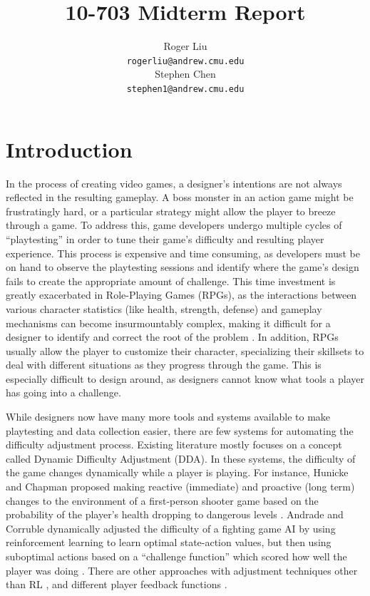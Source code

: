 \documentclass{article}
\title{10-703 Midterm Report}
\author{
  Roger Liu \\
  \texttt{rogerliu@andrew.cmu.edu} \\
  \And
  Stephen Chen \\
  \texttt{stephen1@andrew.cmu.edu} \\
}
\begin{document}
\maketitle
\section{Introduction}
In the process of creating video games, a designer’s intentions are not always reflected in the resulting gameplay. A boss monster in an action game might be frustratingly hard, or a particular strategy might allow the player to breeze through a game. To address this, game developers undergo multiple cycles of ``playtesting'' in order to tune their game's difficulty and resulting player experience. This process is expensive and time consuming, as developers must be on hand to observe the playtesting sessions and identify where the game's design fails to create the appropriate amount of challenge. This time investment is greatly exacerbated in Role-Playing Games (RPGs), as the interactions between various character statistics (like health, strength, defense) and gameplay mechanisms can become insurmountably complex, making it difficult for a designer to identify and correct the root of the problem \cite{rpgbalance}. In addition, RPGs usually allow the player to customize their character, specializing their skillsets to deal with different situations as they progress through the game. This is especially difficult to design around, as designers cannot know what tools a player has going into a challenge.

While designers now have many more tools and systems available to make playtesting and data collection easier, there are few systems for automating the difficulty adjustment process. Existing literature mostly focuses on a concept called Dynamic Difficulty Adjustment (DDA). In these systems, the difficulty of the game changes dynamically while a player is playing. For instance, Hunicke and Chapman proposed making reactive (immediate) and proactive (long term) changes to the environment of a first-person shooter game based on the probability of the player’s health dropping to dangerous levels \cite{hunicke2004ai}. Andrade and Corruble dynamically adjusted the difficulty of a fighting game AI by using reinforcement learning to learn optimal state-action values, but then using suboptimal actions based on a ``challenge function'' which scored how well the player was doing \cite{andrade2005challenge}. There are other approaches with adjustment techniques other than RL \cite{spronck2003online,missura2009player}, and different player feedback functions \cite{liu2009dynamic,zook2012temporal}. 
\end{document}
